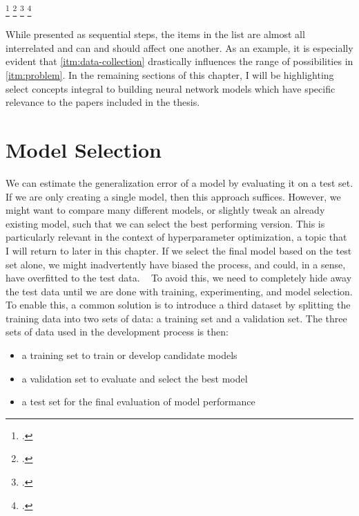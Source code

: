 \marginnote{\vspace{6em}}
\addtocounter{footnote}{-4} 
\footcitetext{cholletDeep2021}
\footcitetext{lecunHandwritten1989}
\footcitetext{cholletDeep2021}
\footcitetext{goodfellow2016deep}

While presented as sequential steps, 
the items in the list are almost all interrelated 
and can and should affect one another. 
As an example, 
it is especially evident that
\cref{itm:data-collection} 
drastically influences the range of possibilities in 
\cref{itm:problem}.
In the remaining sections of this chapter, 
I will be highlighting select concepts integral to  
building neural network models which have specific
relevance to the papers included in the thesis.

\section{Model Selection}
\label{sec:model-selection}

We can estimate the generalization error of a model
by evaluating it on a test set.
If we are only creating a single model,
then this approach suffices. 
However, we might want to compare many different models,
or slightly tweak an already existing model,
such that we can select the best performing version.
This is particularly relevant in the context of hyperparameter optimization,
a topic that I will return to later in this chapter.
If we select the final model based on the test set alone,
we might inadvertently have biased the process,
and could, in a sense, have overfitted to the test data.
~\autocite{murphyMachine2012}
To avoid this, we need to completely hide away the test data
until we are done with training, experimenting, 
and model selection.
To enable this, a common solution is to introduce a third dataset by splitting 
the training data into two sets of data: a training set and a validation set.
The three sets of data used in the development process is then: 
%
\begin{itemize}
    \item a training set to train or develop candidate models
    \item a validation set to evaluate and select the best model
    \item a test set for the final evaluation of model performance
\end{itemize}

